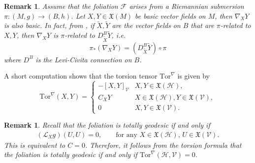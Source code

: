 \documentclass[11pt]{article}
\numberwithin{equation}{section}
\newtheorem{remark}[theorem]{Remark}
\newcommand{\Ho}{\mathcal H}
\newcommand{\V}{\mathcal V}
\newcommand{\hor}{\mathcal H}
\newcommand{\ver}{\mathcal V}
\newcommand{\Tor}{\mathrm{Tor}}
\begin{document}
\begin{remark}\label{connection project}
Assume that the foliation $\mathcal{F}$ arises from a Riemannian submersion $\pi :(M,g) \to (B,h)$. Let $X,Y \in \mathfrak{X}(M)$ be basic vector fields on $M$, then $\nabla_X Y$ is also basic. In fact, from \cite[Lemma 1.4.1]{Gromoll}, if $\tilde{X},\tilde{Y}$ are the vector fields on $B$ that are $\pi$-related to $X,Y$, then $\nabla_X Y$ is $\pi$-related to $D^B_{\tilde X} \tilde {Y}$, i.e.
\[
\pi_* \left(\nabla_X Y \right) =(D^B_{\tilde X} \tilde {Y}) \circ \pi
\]
where $D^B$ is the Levi-Civita connection on $B$. 
\end{remark}



A short computation shows that the torsion tensor  $\Tor^\nabla$   is  given by
\begin{equation*}
\Tor^\nabla(X,Y) = \begin{cases}
- [X,Y]_\mathcal{V} & X,Y \in \mathfrak{X}(\hor), \\
C_X Y  &  X \in \mathfrak{X}(\hor), Y \in \mathfrak{X}(\V), \\
0 & X,Y \in \mathfrak{X}(\ver).
\end{cases}
\end{equation*}

\begin{remark}
Recall that the foliation is totally geodesic if and only if
\begin{align}\label{total geodesic condition}
 (\mathcal{L}_X g)(U, U)=0, \qquad \text{for any $X \in \mathfrak{X}(\Ho)$, $U \in \mathfrak{X}(\V)$.}
 \end{align}
This is equivalent to $C=0$. Therefore, it follows from the torsion formula that the foliation is totally geodesic if and only if $\Tor^\nabla(\Ho,\V)=0$.
\end{remark}
\end{document}
